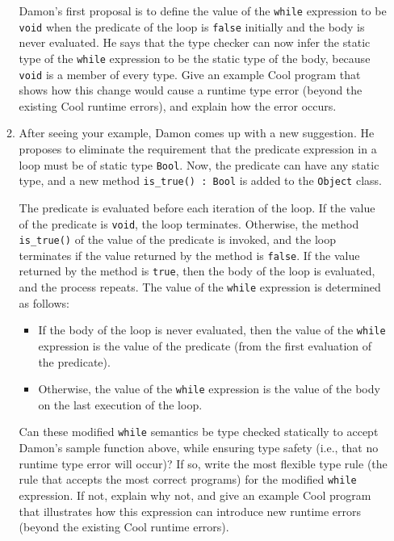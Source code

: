 \documentclass[11pt]{article}
\begin{document}
\begin{enumerate}
\begin{enumerate}
Damon's first proposal is to define the value of the \texttt{while}
expression to be \texttt{void} when the predicate of the loop is
\texttt{false} initially and the body is never evaluated.  He says
that the type checker can now infer the static type of the
\texttt{while} expression to be the static type of the body, because
\texttt{void} is a member of every type.  Give an example Cool program
that shows how this change would cause a runtime type error (beyond
the existing Cool runtime errors), and explain how the error occurs.

\item After seeing your example, Damon comes up with a new suggestion.
He proposes to eliminate the requirement that the predicate expression
in a loop must be of static type \texttt{Bool}.  Now, the predicate
can have any static type, and a new method \texttt{is\_true() : Bool}
is added to the \texttt{Object} class.

The predicate is evaluated before each iteration of the loop.  If the
value of the predicate is \texttt{void}, the loop terminates.
Otherwise, the method \texttt{is\_true()} of the value of the
predicate is invoked, and the loop terminates if the value returned by
the method is \texttt{false}.  If the value returned by the method is
\texttt{true}, then the body of the loop is evaluated, and the process
repeats.  The value of the \texttt{while} expression is determined as
follows:

\begin{itemize}
\item If the body of the loop is never evaluated, then the value of
the \texttt{while} expression is the value of the predicate (from the
first evaluation of the predicate).

\item Otherwise, the value of the \texttt{while} expression is the
value of the body on the last execution of the loop.
\end{itemize}

Can these modified \texttt{while} semantics be type checked statically
to accept Damon's sample function above, while ensuring type safety
(i.e., that no runtime type error will occur)?  If so, write the most
flexible type rule (the rule that accepts the most correct programs)
for the modified \texttt{while} expression.  If not, explain why not,
and give an example Cool program that illustrates how this expression
can introduce new runtime errors (beyond the existing Cool runtime
errors).


\end{enumerate}
\end{enumerate}
\end{document}
